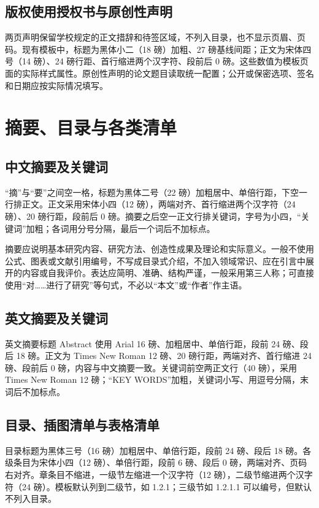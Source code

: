 \subsection{版权使用授权书与原创性声明}

两页声明保留学校规定的正文措辞和待签区域，不列入目录，也不显示页眉、页码。现有模板中，标题为黑体小二（18 磅）加粗、27 磅基线间距；正文为宋体四号（14 磅）、24 磅行距、首行缩进两个汉字符、段前后 0 磅。这些数值为模板页面的实际样式属性。原创性声明的论文题目读取统一配置；公开或保密选项、签名和日期应按实际情况填写。

\section{摘要、目录与各类清单}

\subsection{中文摘要及关键词}

“摘”与“要”之间空一格，标题为黑体二号（22 磅）加粗居中、单倍行距，下空一行排正文。正文采用宋体小四（12 磅），两端对齐、首行缩进两个汉字符（24 磅）、20 磅行距，段前后 0 磅。摘要之后空一正文行排关键词，字号为小四，“关键词”加粗；各词用分号分隔，最后一个词后不加标点。

摘要应说明基本研究内容、研究方法、创造性成果及理论和实际意义。一般不使用公式、图表或文献引用编号，不写成目录式介绍，不加入领域常识、应在引言中展开的内容或自我评价。表达应简明、准确、结构严谨，一般采用第三人称；可直接使用“对……进行了研究”等句式，不必以“本文”或“作者”作主语。

\subsection{英文摘要及关键词}

英文摘要标题 Abstract 使用 Arial 16 磅、加粗居中、单倍行距，段前 24 磅、段后 18 磅。正文为 Times New Roman 12 磅、20 磅行距，两端对齐、首行缩进 24 磅、段前后 0 磅，内容与中文摘要一致。关键词前空两正文行（40 磅），采用 Times New Roman 12 磅；“KEY WORDS”加粗，关键词小写、用逗号分隔，末词后不加标点。

\subsection{目录、插图清单与表格清单}

目录标题为黑体三号（16 磅）加粗居中、单倍行距，段前 24 磅、段后 18 磅。各级条目为宋体小四（12 磅）、单倍行距，段前 6 磅、段后 0 磅，两端对齐、页码右对齐。章条目不缩进，一级节左缩进一个汉字符（12 磅），二级节缩进两个汉字符（24 磅）。模板默认列到二级节，如 1.2.1；三级节如 1.2.1.1 可以编号，但默认不列入目录。

